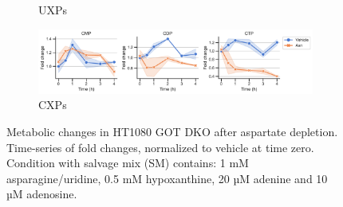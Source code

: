 \begin{figure}[!ht]
\begin{subfigure}[b]{0.68\textwidth}
        \caption{UXPs}
        \label{fig:sapp:GOT_DKO_Asp_depl:HT1080_DKO_uxp}
    \end{subfigure}
    \hfill
    \begin{subfigure}[b]{0.68\textwidth}
        \includegraphics[width=\textwidth]{figures/sapp/GOT_DKO_Asp_depl/HT1080_DKO_cxp.pdf}
        \caption{CXPs}
        \label{fig:sapp:GOT_DKO_Asp_depl:HT1080_DKO_cxp}
    \end{subfigure}
    \hfill
        \caption[Metabolic changes in HT1080 after Asp depl.]{
        Metabolic changes in HT1080 GOT DKO after aspartate depletion.
        Time-series of fold changes, normalized to vehicle at time zero.
        Condition with salvage mix (SM) contains: 1 mM asparagine/uridine, 0.5 mM hypoxanthine, 20 µM adenine and 10 µM adenosine.
        }
        \label{fig:sapp:GOT_DKO_Asp_depl:HT1080_DKO_metab}
\end{figure}





\FloatBarrier

